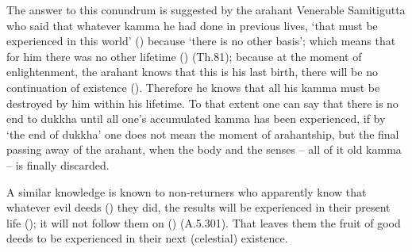 The answer to this conundrum is suggested by the arahant Venerable Samitigutta who said that whatever kamma he had done in previous lives, `that must be experienced in this world' () because `there is no other basis'; which means that for him there was no other lifetime () (Th.81); because at the moment of enlightenment, the arahant knows that this is his last birth, there will be no continuation of existence (). Therefore he knows that all his kamma must be destroyed by him within his lifetime. To that extent one can say that there is no end to dukkha until all one's accumulated kamma has been experienced, if by `the end of dukkha' one does not mean the moment of arahantship, but the final passing away of the arahant, when the body and the senses -- all of it old kamma -- is finally discarded.

A similar knowledge is known to non-returners who apparently know that whatever evil deeds () they did, the results will be experienced in their present life (); it will not follow them on () (A.5.301). That leaves them the fruit of good deeds to be experienced in their next (celestial) existence.
